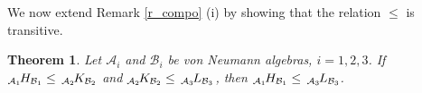 \documentclass[11pt]{amsart}
\newtheorem{theorem}{Theorem}[section]
\theoremstyle{definition}
\newcommand{\cl}[1]{\mathcal{#1}}
\begin{document}
We now extend Remark \ref{r_compo} (i) by showing that the relation $\leq$ is transitive. 


\begin{theorem}\label{preorder} 
Let $\cl{A}_i$ and $\cl{B}_i$ be von Neumann algebras, $i=1,2,3$. 
If $_{\cl{A}_1}\hspace{-0.04cm}H_{\cl{B}_1}\leq\, _{\cl{A}_2}\hspace{-0.04cm}K_{\cl{B}_2}$ and $_{\cl{A}_2}\hspace{-0.04cm}K_{\cl{B}_2}\leq\, _{\cl{A}_3}\hspace{-0.04cm}L_{\cl{B}_3}$, then $_{\cl{A}_1}\hspace{-0.04cm}H_{\cl{B}_1}\leq\, _{\cl{A}_3}\hspace{-0.04cm}L_{\cl{B}_3}$. 
\end{theorem}
\end{document}
